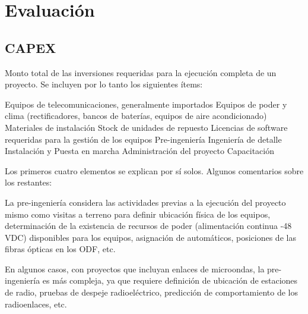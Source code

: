 \section{Evaluaci\'on }\label{sec:evaluacion}

\subsection{CAPEX}

Monto total de las inversiones requeridas para la ejecución completa de un proyecto. Se 
incluyen por lo tanto los siguientes ítems: 

Equipos de telecomunicaciones, generalmente importados 
Equipos de poder y clima (rectificadores, bancos de baterías, equipos de aire 
acondicionado) 
Materiales de instalación 
Stock de unidades de repuesto 
Licencias de software requeridas para la gestión de los equipos 
Pre-ingeniería 
Ingeniería de detalle 
Instalación y Puesta en marcha 
Administración del proyecto 
Capacitación 
 
Los primeros cuatro elementos se explican por sí solos. Algunos comentarios sobre los 
restantes: 
 
La pre-ingeniería considera las actividades previas a la ejecución del proyecto mismo como 
visitas a terreno para definir ubicación física de los equipos, determinación de la existencia de 
recursos de poder (alimentación continua -48 VDC) disponibles para los equipos, asignación de 
automáticos, posiciones de las fibras ópticas en los ODF, etc. 
 
En algunos casos, con proyectos que incluyan enlaces de microondas, la pre-ingeniería es 
más compleja, ya que requiere definición de ubicación de estaciones de radio, pruebas de 
despeje radioeléctrico, predicción de comportamiento de los radioenlaces, etc. 

